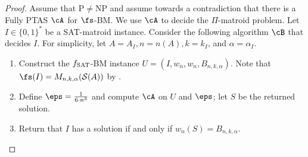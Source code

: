 \begin{proof}
	
	
	
	Assume that P$\neq$NP and assume towards a contradiction that there is a Fully PTAS $\cA$ for $\fs$-BM. We use $\cA$ to decide the $\Pi$-matroid problem.  Let $I \in \{0,1\}^*$ be a SAT-matroid instance. Consider the following algorithm $\cB$ that decides $I$. For simplicity, let $A = A_I, n = n(A), k = k_I$, and $\alpha = \alpha_I$.  %
	\begin{enumerate}
		\item Construct the $f_{\textnormal{SAT}}$-BM instance $%
		U= (I,w_{n},w_{n},B_{n,k,\alpha})$. Note that $\fs (I) = M_{n,k,\alpha}(\mathcal{S}(A))$ by . %
		
		
		\item Define $\eps = \frac{1}{6 \cdot n^3}$ and compute $\cA$ on $U$ and $\eps$; let $S$ be the returned solution.  
		\item Return that $I$ has a solution if and only if $w_n(S) = B_{n,k,\alpha}$. 
	\end{enumerate}
	

\end{proof}
